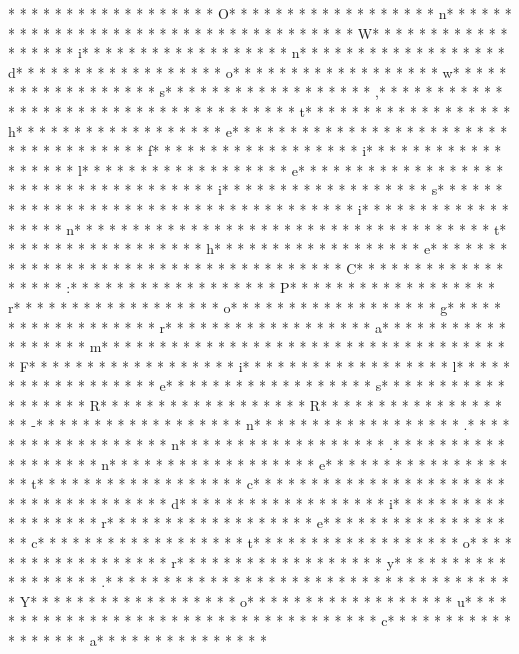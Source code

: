 * * *  * * *  * * *  *  * * *  *  * * *  * O* * *  * * *  * * *  *  * * *  *  * * *  * n* * *  * * *  * * *  *  * * *  *  * * *  *  * * *  * * *  * * *  *  * * *  *  * * *  * W* * *  * * *  * * *  *  * * *  *  * * *  * i* * *  * * *  * * *  *  * * *  *  * * *  * n* * *  * * *  * * *  *  * * *  *  * * *  * d* * *  * * *  * * *  *  * * *  *  * * *  * o* * *  * * *  * * *  *  * * *  *  * * *  * w* * *  * * *  * * *  *  * * *  *  * * *  * s* * *  * * *  * * *  *  * * *  *  * * *  * ,* * *  * * *  * * *  *  * * *  *  * * *  *  * * *  * * *  * * *  *  * * *  *  * * *  * t* * *  * * *  * * *  *  * * *  *  * * *  * h* * *  * * *  * * *  *  * * *  *  * * *  * e* * *  * * *  * * *  *  * * *  *  * * *  *  * * *  * * *  * * *  *  * * *  *  * * *  * f* * *  * * *  * * *  *  * * *  *  * * *  * i* * *  * * *  * * *  *  * * *  *  * * *  * l* * *  * * *  * * *  *  * * *  *  * * *  * e* * *  * * *  * * *  *  * * *  *  * * *  *  * * *  * * *  * * *  *  * * *  *  * * *  * i* * *  * * *  * * *  *  * * *  *  * * *  * s* * *  * * *  * * *  *  * * *  *  * * *  *  * * *  * * *  * * *  *  * * *  *  * * *  * i* * *  * * *  * * *  *  * * *  *  * * *  * n* * *  * * *  * * *  *  * * *  *  * * *  *  * * *  * * *  * * *  *  * * *  *  * * *  * t* * *  * * *  * * *  *  * * *  *  * * *  * h* * *  * * *  * * *  *  * * *  *  * * *  * e* * *  * * *  * * *  *  * * *  *  * * *  *  * * *  * * *  * * *  *  * * *  *  * * *  * C* * *  * * *  * * *  *  * * *  *  * * *  * :* * *  * * *  * * *  *  * * *  *  * * *  * P* * *  * * *  * * *  *  * * *  *  * * *  * r* * *  * * *  * * *  *  * * *  *  * * *  * o* * *  * * *  * * *  *  * * *  *  * * *  * g* * *  * * *  * * *  *  * * *  *  * * *  * r* * *  * * *  * * *  *  * * *  *  * * *  * a* * *  * * *  * * *  *  * * *  *  * * *  * m* * *  * * *  * * *  *  * * *  *  * * *  *  * * *  * * *  * * *  *  * * *  *  * * *  * F* * *  * * *  * * *  *  * * *  *  * * *  * i* * *  * * *  * * *  *  * * *  *  * * *  * l* * *  * * *  * * *  *  * * *  *  * * *  * e* * *  * * *  * * *  *  * * *  *  * * *  * s* * *  * * *  * * *  *  * * *  *  * * *  * R* * *  * * *  * * *  *  * * *  *  * * *  * R* * *  * * *  * * *  *  * * *  *  * * *  * -* * *  * * *  * * *  *  * * *  *  * * *  * n* * *  * * *  * * *  *  * * *  *  * * *  * .* * *  * * *  * * *  *  * * *  *  * * *  * n* * *  * * *  * * *  *  * * *  *  * * *  * .* * *  * * *  * * *  *  * * *  *  * * *  * n* * *  * * *  * * *  *  * * *  *  * * *  * e* * *  * * *  * * *  *  * * *  *  * * *  * t* * *  * * *  * * *  *  * * *  *  * * *  * c* * *  * * *  * * *  *  * * *  *  * * *  *  * * *  * * *  * * *  *  * * *  *  * * *  * d* * *  * * *  * * *  *  * * *  *  * * *  * i* * *  * * *  * * *  *  * * *  *  * * *  * r* * *  * * *  * * *  *  * * *  *  * * *  * e* * *  * * *  * * *  *  * * *  *  * * *  * c* * *  * * *  * * *  *  * * *  *  * * *  * t* * *  * * *  * * *  *  * * *  *  * * *  * o* * *  * * *  * * *  *  * * *  *  * * *  * r* * *  * * *  * * *  *  * * *  *  * * *  * y* * *  * * *  * * *  *  * * *  *  * * *  * .* * *  * * *  * * *  *  * * *  *  * * *  *  * * *  * * *  * * *  *  * * *  *  * * *  * Y* * *  * * *  * * *  *  * * *  *  * * *  * o* * *  * * *  * * *  *  * * *  *  * * *  * u* * *  * * *  * * *  *  * * *  *  * * *  *  * * *  * * *  * * *  *  * * *  *  * * *  * c* * *  * * *  * * *  *  * * *  *  * * *  * a* * *  * * *  * * *  *  * * *  *  * 